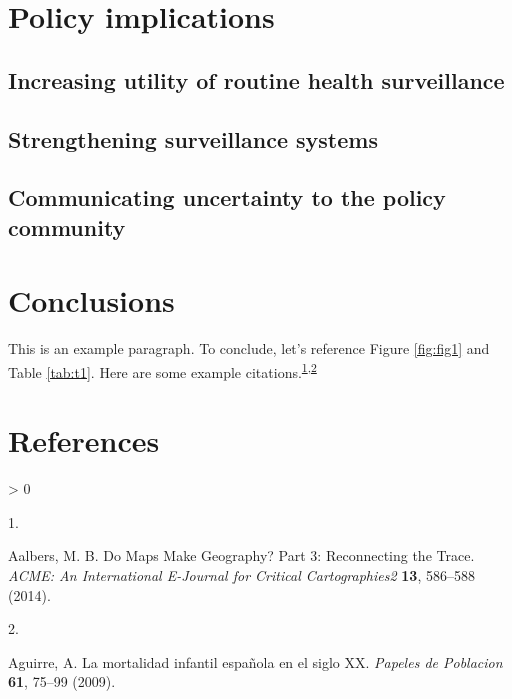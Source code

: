 \documentclass[
]{article}
\newlength{\cslhangindent}
\newlength{\csllabelwidth}
\newenvironment{CSLReferences}[2] %
 {%
  \setlength{\parindent}{0pt}
  \ifodd #1 \everypar{\setlength{\hangindent}{\cslhangindent}}\ignorespaces\fi
  \ifnum #2 > 0
  \setlength{\parskip}{#2\baselineskip}
  \fi
 }%
 {}
\newcommand{\CSLLeftMargin}[1]{\parbox[t]{\csllabelwidth}{#1}}
\newcommand{\CSLRightInline}[1]{\parbox[t]{\linewidth - \csllabelwidth}{#1}\break}
\begin{document}
\lipsum[11-12]

\hypertarget{policy-implications}{%
\section{Policy implications}\label{policy-implications}}

\lipsum[13-15]

\hypertarget{increasing-utility-of-routine-health-surveillance}{%
\subsection{Increasing utility of routine health surveillance}\label{increasing-utility-of-routine-health-surveillance}}

\lipsum[1-6]

\hypertarget{strengthening-surveillance-systems}{%
\subsection{Strengthening surveillance systems}\label{strengthening-surveillance-systems}}

\lipsum[7-10]

\hypertarget{communicating-uncertainty-to-the-policy-community}{%
\subsection{Communicating uncertainty to the policy community}\label{communicating-uncertainty-to-the-policy-community}}

\lipsum[11-15]

\hypertarget{conclusions}{%
\section{Conclusions}\label{conclusions}}

\lipsum[1-5]

This is an example paragraph. To conclude, let's reference Figure \ref{fig:fig1} and Table \ref{tab:t1}. Here are some example citations.\textsuperscript{\protect\hyperlink{ref-Aalbers}{1},\protect\hyperlink{ref-Aguirre2009}{2}}

\hypertarget{references}{%
\section{References}\label{references}}

\hypertarget{refs}{}
\begin{CSLReferences}{0}{0}
\leavevmode\hypertarget{ref-Aalbers}{}%
\CSLLeftMargin{1. }
\CSLRightInline{Aalbers, M. B. {Do Maps Make Geography? Part 3: Reconnecting the Trace}. \emph{ACME: An International E-Journal for Critical Cartographies2} \textbf{13}, 586--588 (2014).}

\leavevmode\hypertarget{ref-Aguirre2009}{}%
\CSLLeftMargin{2. }
\CSLRightInline{Aguirre, A. {La mortalidad infantil espa{ñ}ola en el siglo XX}. \emph{Papeles de Poblacion} \textbf{61}, 75--99 (2009).}

\end{CSLReferences}
\end{document}
